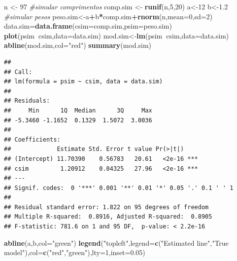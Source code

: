 \documentclass[
]{book}
\newenvironment{Shaded}{\begin{snugshade}}{\end{snugshade}}
\newcommand{\CommentTok}[1]{\textcolor[rgb]{0.56,0.35,0.01}{\textit{#1}}}
\newcommand{\DataTypeTok}[1]{\textcolor[rgb]{0.13,0.29,0.53}{#1}}
\newcommand{\DecValTok}[1]{\textcolor[rgb]{0.00,0.00,0.81}{#1}}
\newcommand{\FloatTok}[1]{\textcolor[rgb]{0.00,0.00,0.81}{#1}}
\newcommand{\KeywordTok}[1]{\textcolor[rgb]{0.13,0.29,0.53}{\textbf{#1}}}
\newcommand{\NormalTok}[1]{#1}
\newcommand{\OperatorTok}[1]{\textcolor[rgb]{0.81,0.36,0.00}{\textbf{#1}}}
\newcommand{\StringTok}[1]{\textcolor[rgb]{0.31,0.60,0.02}{#1}}
\begin{document}
\begin{Shaded}
\begin{Highlighting}[]
\NormalTok{n <-}\StringTok{ }\DecValTok{97}
\CommentTok{#simular comprimentos}
\NormalTok{comp.sim <-}\StringTok{ }\KeywordTok{runif}\NormalTok{(n,}\DecValTok{5}\NormalTok{,}\DecValTok{20}\NormalTok{)}
\NormalTok{a<-}\DecValTok{12}
\NormalTok{b<-}\FloatTok{1.2}
\CommentTok{#simular pesos}
\NormalTok{peso.sim<-a}\OperatorTok{+}\NormalTok{b}\OperatorTok{*}\NormalTok{comp.sim}\OperatorTok{+}\KeywordTok{rnorm}\NormalTok{(n,}\DataTypeTok{mean=}\DecValTok{0}\NormalTok{,}\DataTypeTok{sd=}\DecValTok{2}\NormalTok{)}
\NormalTok{data.sim=}\KeywordTok{data.frame}\NormalTok{(}\DataTypeTok{csim=}\NormalTok{comp.sim,}\DataTypeTok{psim=}\NormalTok{peso.sim)}
\KeywordTok{plot}\NormalTok{(psim}\OperatorTok{~}\NormalTok{csim,}\DataTypeTok{data=}\NormalTok{data.sim)}
\NormalTok{mod.sim<-}\KeywordTok{lm}\NormalTok{(psim}\OperatorTok{~}\NormalTok{csim,}\DataTypeTok{data=}\NormalTok{data.sim)}
\KeywordTok{abline}\NormalTok{(mod.sim,}\DataTypeTok{col=}\StringTok{"red"}\NormalTok{)}
\KeywordTok{summary}\NormalTok{(mod.sim)}
\end{Highlighting}
\end{Shaded}

\begin{verbatim}
## 
## Call:
## lm(formula = psim ~ csim, data = data.sim)
## 
## Residuals:
##     Min      1Q  Median      3Q     Max 
## -5.3460 -1.1652  0.1329  1.5072  3.0036 
## 
## Coefficients:
##             Estimate Std. Error t value Pr(>|t|)    
## (Intercept) 11.70390    0.56783   20.61   <2e-16 ***
## csim         1.20912    0.04325   27.96   <2e-16 ***
## ---
## Signif. codes:  0 '***' 0.001 '**' 0.01 '*' 0.05 '.' 0.1 ' ' 1
## 
## Residual standard error: 1.822 on 95 degrees of freedom
## Multiple R-squared:  0.8916,	Adjusted R-squared:  0.8905 
## F-statistic: 781.6 on 1 and 95 DF,  p-value: < 2.2e-16
\end{verbatim}

\begin{Shaded}
\begin{Highlighting}[]
\KeywordTok{abline}\NormalTok{(a,b,}\DataTypeTok{col=}\StringTok{"green"}\NormalTok{)}
\KeywordTok{legend}\NormalTok{(}\StringTok{"topleft"}\NormalTok{,}\DataTypeTok{legend=}\KeywordTok{c}\NormalTok{(}\StringTok{"Estimated line"}\NormalTok{,}\StringTok{"True model"}\NormalTok{),}\DataTypeTok{col=}\KeywordTok{c}\NormalTok{(}\StringTok{"red"}\NormalTok{,}\StringTok{"green"}\NormalTok{),}\DataTypeTok{lty=}\DecValTok{1}\NormalTok{,}\DataTypeTok{inset=}\FloatTok{0.05}\NormalTok{)}
\end{Highlighting}
\end{Shaded}
\end{document}
